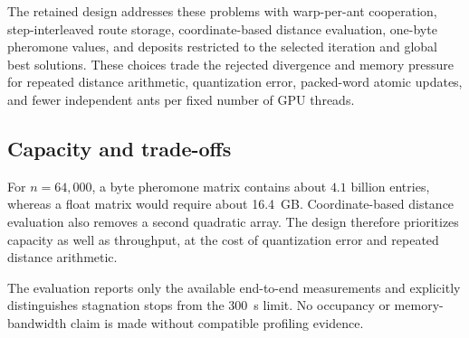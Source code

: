The retained design addresses these problems with warp-per-ant cooperation, step-interleaved route storage, coordinate-based distance evaluation, one-byte pheromone values, and deposits restricted to the selected iteration and global best solutions.  These choices trade the rejected divergence and memory pressure for repeated distance arithmetic, quantization error, packed-word atomic updates, and fewer independent ants per fixed number of GPU threads.

\subsection{Capacity and trade-offs}

For $n=64{,}000$, a byte pheromone matrix contains about $4.1$ billion entries, whereas a float matrix would require about 16.4~GB.  Coordinate-based distance evaluation also removes a second quadratic array.  The design therefore prioritizes capacity as well as throughput, at the cost of quantization error and repeated distance arithmetic.

The evaluation reports only the available end-to-end measurements and explicitly distinguishes stagnation stops from the 300~s limit.  No occupancy or memory-bandwidth claim is made without compatible profiling evidence.
